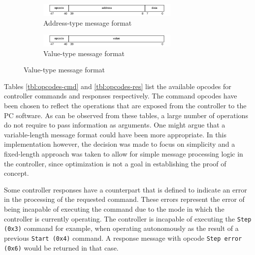 \documentclass[main.tex]{subfiles}
\begin{document}
\begin{figure}
    \centering
    \caption{Message formats for a controller with an address width of 32 and a data width of 8.}
    \label{fig:message-formats}    \begin{subfigure}[t]{\textwidth}
        \centering
        \caption{Address-type message format}
        \label{fig:message-format-address-typed}
        \includegraphics[width=0.75\textwidth]{img/message-format-address-typed}%
    \end{subfigure}
    \begin{subfigure}[t]{\textwidth}
        \centering
        \caption{Value-type message format}
        \label{fig:message-format-value-typed}
        \includegraphics[width=0.75\textwidth]{img/message-format-value-typed}%
    \end{subfigure}

\end{figure}

Tables \ref{tbl:opcodes-cmd} and \ref{tbl:opcodes-res} list the available opcodes for controller commands and responses respectively. The command opcodes have been chosen to reflect the operations that are exposed from the controller to the PC software. As can be observed from these tables, a large number of operations do not require to pass information as arguments. One might argue that a variable-length message format could have been more appropriate. In this implementation however, the decision was made to focus on simplicity and a fixed-length approach was taken to allow for simple message processing logic in the controller, since optimization is not a goal in establishing the proof of concept.

Some controller responses have a counterpart that is defined to indicate an error in the processing of the requested command. These errors represent the error of being incapable of executing the command due to the mode in which the controller is currently operating. The controller is incapable of executing the \texttt{Step (0x3)} command for example, when operating autonomously as the result of a previous \texttt{Start (0x4)} command. A response message with opcode \texttt{Step error (0x6)} would be returned in that case. 
\end{document}

